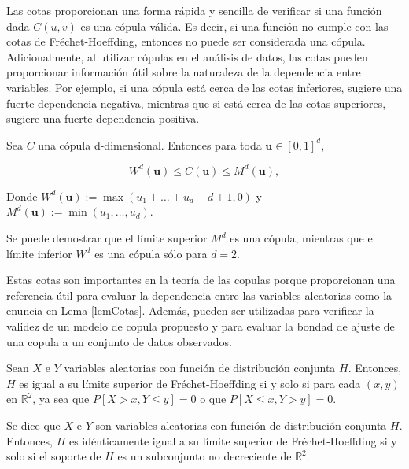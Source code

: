 Las cotas proporcionan una forma rápida y sencilla de verificar si una función dada $C(u, v)$  es una cópula válida. Es decir, si una función no cumple con las cotas de Fréchet-Hoeffding, entonces no puede ser considerada una cópula. Adicionalmente, al utilizar cópulas en el análisis de datos, las cotas pueden proporcionar información útil sobre la naturaleza de la dependencia entre variables. Por ejemplo, si una cópula está cerca de las cotas inferiores, sugiere una fuerte dependencia negativa, mientras que si está cerca de las cotas superiores, sugiere una fuerte dependencia positiva.

\begin{defn}
    Sea $C$ una cópula d-dimensional. Entonces para toda $\boldsymbol{u} \in[0,1]^d$,

    \begin{equation}
        W^d(\boldsymbol{u}) \leq C(\boldsymbol{u}) \leq M^d(\boldsymbol{u}),
    \end{equation}

Donde $W^d(\boldsymbol{u}):= \max \left(u_1+\ldots+u_d-d+1,0\right)$ y $M^d(\boldsymbol{u}):=\min \left(u_1, \ldots, u_d\right)$.
\end{defn}

Se puede demostrar que el límite superior $M^d$ es una cópula, mientras que el límite inferior $W^d$ es una cópula sólo para $d = 2$.

Estas cotas son importantes en la teoría de las copulas porque proporcionan una referencia útil para evaluar la dependencia entre las variables aleatorias como la enuncia en Lema \ref{lemCotas}. Además, pueden ser utilizadas para verificar la validez de un modelo de copula propuesto y para evaluar la bondad de ajuste de una copula a un conjunto de datos observados.

\begin{lema}\label{lemCotas}
    Sean $X$ e $Y$ variables aleatorias con función de distribución conjunta $H$. Entonces, $H$ es igual a su límite superior de Fréchet-Hoeffding si y solo si para cada $(x, y)$ en $\mathbb{R}^2$, ya sea que $P[X > x, Y \leq y] = 0$ o que $P[X \leq x, Y > y] = 0$.
\end{lema}

\begin{teor}
    Se dice que $X$ e $Y$ son variables aleatorias con función de distribución conjunta $H$. Entonces, $H$ es idénticamente igual a su límite superior de Fréchet-Hoeffding si y solo si el soporte de $H$ es un subconjunto no decreciente de $\mathbb{R}^2$.
\end{teor}

